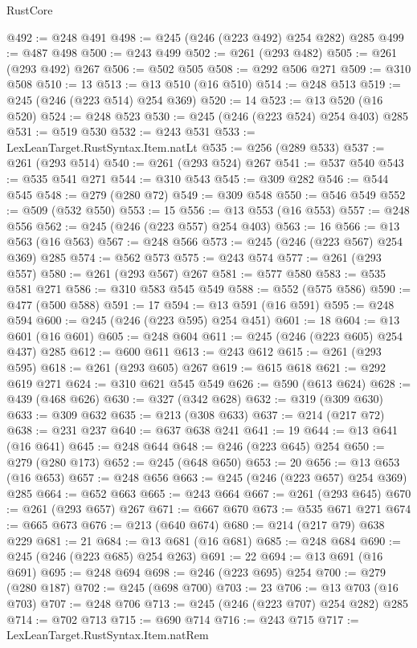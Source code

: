 \begin{lexlean}{RustCore}
\begin{coremodule}
@492 := @248 @491
@498 := @245 (@246 (@223 @492) @254 @282) @285
@499 := @487 @498
@500 := @243 @499
@502 := @261 (@293 @482)
@505 := @261 (@293 @492) @267
@506 := @502 @505
@508 := @292 @506 @271
@509 := @310 @508
@510 := 13
@513 := @13 @510 (@16 @510)
@514 := @248 @513
@519 := @245 (@246 (@223 @514) @254 @369)
@520 := 14
@523 := @13 @520 (@16 @520)
@524 := @248 @523
@530 := @245 (@246 (@223 @524) @254 @403) @285
@531 := @519 @530
@532 := @243 @531
@533 := LexLeanTarget.RustSyntax.Item.natLt
@535 := @256 (@289 @533)
@537 := @261 (@293 @514)
@540 := @261 (@293 @524) @267
@541 := @537 @540
@543 := @535 @541 @271
@544 := @310 @543
@545 := @309 @282
@546 := @544 @545
@548 := @279 (@280 @72)
@549 := @309 @548
@550 := @546 @549
@552 := @509 (@532 @550)
@553 := 15
@556 := @13 @553 (@16 @553)
@557 := @248 @556
@562 := @245 (@246 (@223 @557) @254 @403)
@563 := 16
@566 := @13 @563 (@16 @563)
@567 := @248 @566
@573 := @245 (@246 (@223 @567) @254 @369) @285
@574 := @562 @573
@575 := @243 @574
@577 := @261 (@293 @557)
@580 := @261 (@293 @567) @267
@581 := @577 @580
@583 := @535 @581 @271
@586 := @310 @583 @545 @549
@588 := @552 (@575 @586)
@590 := @477 (@500 @588)
@591 := 17
@594 := @13 @591 (@16 @591)
@595 := @248 @594
@600 := @245 (@246 (@223 @595) @254 @451)
@601 := 18
@604 := @13 @601 (@16 @601)
@605 := @248 @604
@611 := @245 (@246 (@223 @605) @254 @437) @285
@612 := @600 @611
@613 := @243 @612
@615 := @261 (@293 @595)
@618 := @261 (@293 @605) @267
@619 := @615 @618
@621 := @292 @619 @271
@624 := @310 @621 @545 @549
@626 := @590 (@613 @624)
@628 := @439 (@468 @626)
@630 := @327 (@342 @628)
@632 := @319 (@309 @630)
@633 := @309 @632
@635 := @213 (@308 @633)
@637 := @214 (@217 @72)
@638 := @231 @237
@640 := @637 @638 @241
@641 := 19
@644 := @13 @641 (@16 @641)
@645 := @248 @644
@648 := @246 (@223 @645) @254
@650 := @279 (@280 @173)
@652 := @245 (@648 @650)
@653 := 20
@656 := @13 @653 (@16 @653)
@657 := @248 @656
@663 := @245 (@246 (@223 @657) @254 @369) @285
@664 := @652 @663
@665 := @243 @664
@667 := @261 (@293 @645)
@670 := @261 (@293 @657) @267
@671 := @667 @670
@673 := @535 @671 @271
@674 := @665 @673
@676 := @213 (@640 @674)
@680 := @214 (@217 @79) @638 @229
@681 := 21
@684 := @13 @681 (@16 @681)
@685 := @248 @684
@690 := @245 (@246 (@223 @685) @254 @263)
@691 := 22
@694 := @13 @691 (@16 @691)
@695 := @248 @694
@698 := @246 (@223 @695) @254
@700 := @279 (@280 @187)
@702 := @245 (@698 @700)
@703 := 23
@706 := @13 @703 (@16 @703)
@707 := @248 @706
@713 := @245 (@246 (@223 @707) @254 @282) @285
@714 := @702 @713
@715 := @690 @714
@716 := @243 @715
@717 := LexLeanTarget.RustSyntax.Item.natRem

\end{coremodule}
\end{lexlean}
